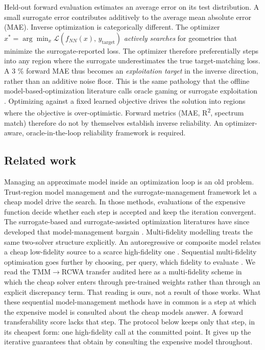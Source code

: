 \documentclass[11pt,a4paper]{article}
\begin{document}
Held-out forward evaluation estimates an average error on its test distribution. A small surrogate error contributes additively to the average mean absolute error (MAE). Inverse optimization is
categorically different. The optimizer
\(x^{*} = \arg\min_x \mathcal{L}\!\left(f_{NN}(x),\, y_{\text{target}}\right)\) \emph{actively
searches} for geometries that minimize the surrogate-reported loss. The optimizer
therefore preferentially steps into any region where the surrogate underestimates the true
target-matching loss. A 3 \% forward MAE thus becomes an \emph{exploitation target} in the
inverse direction, rather than an additive noise floor. This is the same pathology that
the offline model-based-optimization literature calls oracle gaming or surrogate
exploitation \cite{kumar202013,trabucco202114,trabucco202215,fannjiang202016}. Optimizing against a fixed learned objective drives the solution
into regions where the objective is over-optimistic. Forward metrics (MAE, R\textsuperscript{2}, spectrum
match) therefore do not by themselves establish inverse reliability. An optimizer-aware,
oracle-in-the-loop reliability framework is required.

\subsection{Related work}\label{sec:1.3}

Managing an approximate model inside an optimization loop is an old problem. Trust-region
model management \cite{alexandrov199817} and the surrogate-management framework \cite{booker199918} let a cheap model drive
the search. In those methods, evaluations of the expensive function decide whether each
step is accepted and keep the iteration convergent. The surrogate-based and
surrogate-assisted optimization literatures have since developed that model-management
bargain \cite{forrester200919,jin201120}. Multi-fidelity modelling treats the same two-solver structure
explicitly. An autoregressive or composite model relates a cheap low-fidelity source to a
scarce high-fidelity one \cite{kennedy200021,peherstorfer201822,meng202023}. Sequential multi-fidelity optimisation goes further by
choosing, per query, which fidelity to evaluate \cite{kandasamy201760}. We read the TMM\ensuremath{\rightarrow}RCWA transfer
audited here as a multi-fidelity scheme in which the cheap solver enters through
pre-trained weights rather than through an explicit discrepancy term. That reading is
ours, not a result of those works. What these sequential model-management methods have in
common is a step at which the expensive model is consulted about the cheap model\textquotesingle s answer.
A forward transferability score lacks that step. The protocol below keeps only that step,
in its cheapest form: one high-fidelity call at the committed point. It gives up the
iterative guarantees that \cite{alexandrov199817,booker199918} obtain by consulting the expensive model throughout.
\end{document}
